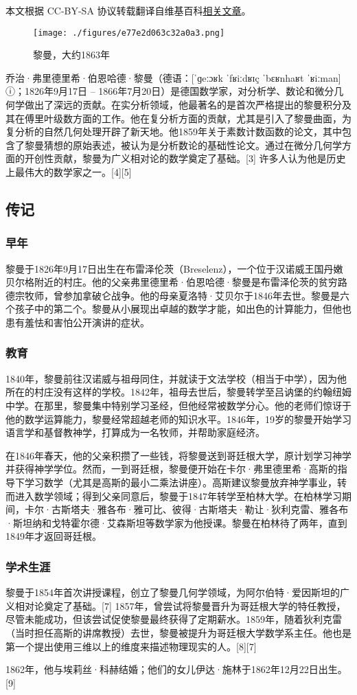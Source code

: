 
本文根据 CC-BY-SA 协议转载翻译自维基百科\href{https://en.wikipedia.org/wiki/Bernhard_Riemann}{相关文章}。

\begin{figure}[ht]
\centering
\texttt{[image: ./figures/e77e2d063c32a0a3.png]}
\caption{黎曼，大约1863年} \label{fig_BEHDLM_1}
\end{figure}
乔治·弗里德里希·伯恩哈德·黎曼（德语：[ˈɡeːɔʁk ˈfʁiːdʁɪç ˈbɛʁnhaʁt ˈʁiːman] ⓘ；1826年9月17日 – 1866年7月20日）是德国数学家，对分析学、数论和微分几何学做出了深远的贡献。在实分析领域，他最著名的是首次严格提出的黎曼积分及其在傅里叶级数方面的工作。他在复分析方面的贡献，尤其是引入了黎曼曲面，为复分析的自然几何处理开辟了新天地。他1859年关于素数计数函数的论文，其中包含了黎曼猜想的原始表述，被认为是分析数论的基础性论文。通过在微分几何学方面的开创性贡献，黎曼为广义相对论的数学奠定了基础。[3] 许多人认为他是历史上最伟大的数学家之一。[4][5]
\subsection{传记}  
\subsubsection{早年}  
黎曼于1826年9月17日出生在布雷泽伦茨（Breselenz），一个位于汉诺威王国丹嫩贝尔格附近的村庄。他的父亲弗里德里希·伯恩哈德·黎曼是布雷泽伦茨的贫穷路德宗牧师，曾参加拿破仑战争。他的母亲夏洛特·艾贝尔于1846年去世。黎曼是六个孩子中的第二个。黎曼从小展现出卓越的数学才能，如出色的计算能力，但他也患有羞怯和害怕公开演讲的症状。
\subsubsection{教育}  
1840年，黎曼前往汉诺威与祖母同住，并就读于文法学校（相当于中学），因为他所在的村庄没有这样的学校。1842年，祖母去世后，黎曼转学至吕讷堡的约翰纽姆中学。在那里，黎曼集中特别学习圣经，但他经常被数学分心。他的老师们惊讶于他的数学运算能力，黎曼经常超越老师的知识水平。1846年，19岁的黎曼开始学习语言学和基督教神学，打算成为一名牧师，并帮助家庭经济。

在1846年春天，他的父亲积攒了一些钱，将黎曼送到哥廷根大学，原计划学习神学并获得神学学位。然而，一到哥廷根，黎曼便开始在卡尔·弗里德里希·高斯的指导下学习数学（尤其是高斯的最小二乘法讲座）。高斯建议黎曼放弃神学事业，转而进入数学领域；得到父亲同意后，黎曼于1847年转学至柏林大学。在柏林学习期间，卡尔·古斯塔夫·雅各布·雅可比、彼得·古斯塔夫·勒让·狄利克雷、雅各布·斯坦纳和戈特霍尔德·艾森斯坦等数学家为他授课。黎曼在柏林待了两年，直到1849年才返回哥廷根。
\subsubsection{学术生涯}  
黎曼于1854年首次讲授课程，创立了黎曼几何学领域，为阿尔伯特·爱因斯坦的广义相对论奠定了基础。[7] 1857年，曾尝试将黎曼晋升为哥廷根大学的特任教授，尽管未能成功，但该尝试促使黎曼最终获得了定期薪水。1859年，随着狄利克雷（当时担任高斯的讲席教授）去世，黎曼被提升为哥廷根大学数学系主任。他也是第一个提出使用三维以上的维度来描述物理现实的人。[8][7]

1862年，他与埃莉丝·科赫结婚；他们的女儿伊达·施林于1862年12月22日出生。[9]
